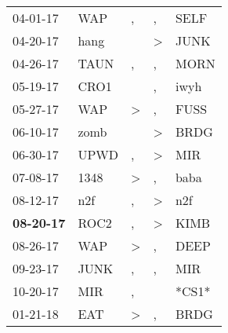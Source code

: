 \begin{supertabular}{p{0.07\textwidth}p{0.06\textwidth}p{0.02\textwidth}p{0.02\textwidth}p{0.06\textwidth}}
          04-01-17\textsuperscript{} &            WAP\textsuperscript{} &                , &                , &           SELF\textsuperscript{} \\
          04-20-17\textsuperscript{} &           hang\textsuperscript{} &                  &     \textgreater &           JUNK\textsuperscript{} \\
          04-26-17\textsuperscript{} &           TAUN\textsuperscript{} &                , &                , &           MORN\textsuperscript{} \\
          05-19-17\textsuperscript{} &           CRO1\textsuperscript{} &                  &                , &           iwyh\textsuperscript{} \\
          05-27-17\textsuperscript{} &            WAP\textsuperscript{} &     \textgreater &                , &           FUSS\textsuperscript{} \\
          06-10-17\textsuperscript{} &           zomb\textsuperscript{} &                  &     \textgreater &           BRDG\textsuperscript{} \\
          06-30-17\textsuperscript{} &           UPWD\textsuperscript{} &                , &     \textgreater &            MIR\textsuperscript{} \\
          07-08-17\textsuperscript{} &           1348\textsuperscript{} &     \textgreater &                , &           baba\textsuperscript{} \\
          08-12-17\textsuperscript{} &            n2f\textsuperscript{} &                , &     \textgreater &            n2f\textsuperscript{} \\
 \textbf{08-20-17\textsuperscript{}} &           ROC2\textsuperscript{} &                , &     \textgreater &           KIMB\textsuperscript{} \\
          08-26-17\textsuperscript{} &            WAP\textsuperscript{} &     \textgreater &                , &           DEEP\textsuperscript{} \\
          09-23-17\textsuperscript{} &           JUNK\textsuperscript{} &                , &                , &            MIR\textsuperscript{} \\
          10-20-17\textsuperscript{} &            MIR\textsuperscript{} &                , &                  &                            *CS1* \\
          01-21-18\textsuperscript{} &            EAT\textsuperscript{} &     \textgreater &                , &           BRDG\textsuperscript{} \\

\end{supertabular}
